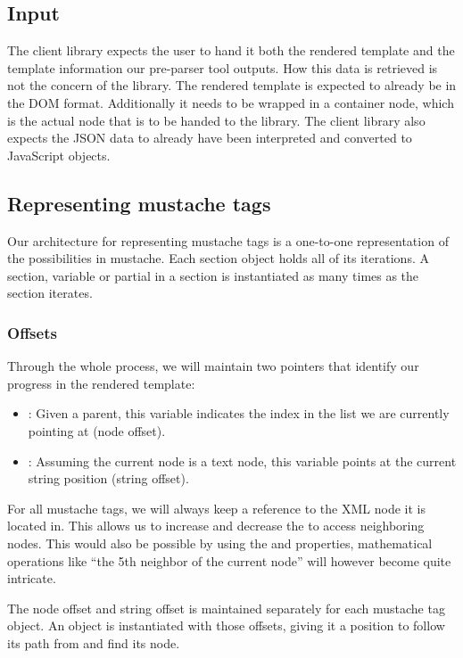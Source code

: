 \documentclass[thesis.tex]{subfiles}
\begin{document}
\subsection{Input}
The client library expects the user to hand it both the rendered template and
the template information our pre-parser tool outputs.
How this data is retrieved is not the concern of the library.
The rendered template is expected to already be in the DOM format.
Additionally it needs to be wrapped in a container node,
which is the actual node that is to be handed to the library.
The client library also expects the JSON data to already have been interpreted
and converted to JavaScript objects.

\subsection{Representing mustache tags}
Our architecture for representing mustache tags is a one-to-one representation
of the possibilities in mustache.
Each section object holds all of its iterations. A section, variable or partial
in a section is instantiated as many times as the section iterates.

\subsubsection{Offsets}
Through the whole process, we will maintain two pointers that identify our
progress in the rendered template:
\begin{itemize}
\item {}: Given a parent, this variable indicates the index
      in the  list we are currently pointing at (node offset).
\item {}: Assuming the current node is a text node, this variable
      points at the current string position (string offset).
\end{itemize}

For all mustache tags, we will always keep a reference to the 
XML node it is located in. This allows us to increase and decrease the
 to access neighboring nodes. This would also be possible by
using the  and  properties,
mathematical operations like ``the 5th neighbor of the current node'' will
however become quite intricate.

The node offset and string offset is maintained separately for each mustache tag
object. An object is instantiated with those offsets, giving it a position to
follow its path from and find its node.
\end{document}
